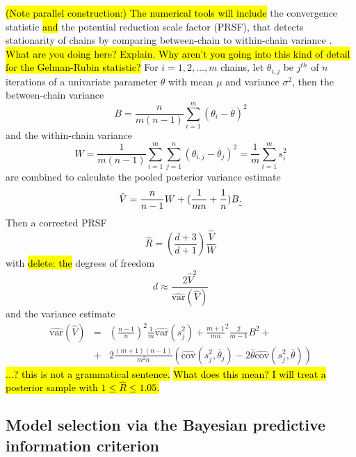 \documentclass[12pt]{article}
\newcommand{\trish}[1]{\textrm{\hl{#1}}}
\begin{document}
\trish{(Note parallel construction:) The numerical tools will include}
the \citet{GelRub1992} convergence statistic \trish{and} the potential
reduction scale factor (PRSF), that detects stationarity of chains by
comparing between-chain to within-chain variance
\citep{BroGel1998}. \trish{What are you doing here?  Explain.  Why
aren't you going into this kind of detail for the Gelman-Rubin
statistic?} For $i = 1, 2, \dots, m$ chains, let $\theta_{i, j}$ be
$j^{th}$ of $n$ iterations of a univariate parameter $\theta$ with
mean $\mu$ and variance $\sigma^2$, then the between-chain variance
%    
\begin{equation}
B = \frac{n}{m(n-1)}\sum_{i=1}^m(\theta_i - \overline\theta)^2
\end{equation}
and the within-chain variance
%
\begin{equation}
W = \frac{1}{m(n-1)}\sum_{i=1}^m \sum_{j=1}^n(\theta_{i,j} - \overline\theta_j)^2 = \frac{1}{m}\sum_{i=1}^m s_i^2
\end{equation}
%
are combined to calculate the pooled posterior variance estimate 
%
\begin{equation}
\hat V = \frac{n}{n-1}W + (\frac{1}{mn} + \frac{1}{n})B\trish{.}
\end{equation}
%
Then a corrected PRSF
%
\begin{equation}
\hat R = (\frac{d+3}{d+1})\frac{\hat V}{W}
\end{equation}
%
with \trish{delete: the} degrees of freedom
%
\begin{equation}
d \approx \frac{2 \hat V^2}
{\operatorname{\hat {var}} (\hat V)}
\end{equation}
%
and the variance estimate
%
\begin{eqnarray}
\operatorname{\hat {var}}(\hat V) & = & (\frac{n-1}{n})^2 \frac{1}{m} \operatorname{\hat {var}}(s_j^2) + \frac{m+1}{mn}^2 \frac{2}{m-1}B^2 + \nonumber \\
& + & 2\frac{(m+1)(n-1)}{m^2n}(\operatorname{\hat {cov}}(s_j^2,\overline\theta_j) - 2\overline\theta\operatorname{\hat {cov}}(s_j^2,\overline\theta))
\end{eqnarray}
%
\trish{...? this is not a grammatical sentence.}
\trish{What does this mean? I will treat a posterior sample with $1 \leq \hat R \leq 1.05$.}

\subsection{Model selection via the Bayesian predictive information criterion}
\end{document}
